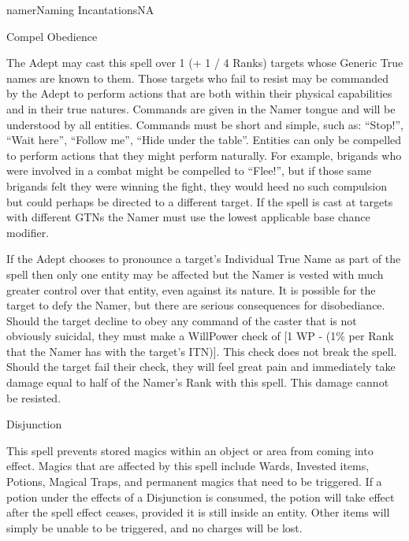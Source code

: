 \begin{college}[2.0]{namer}{Naming Incantations}{NA}
\begin{spell}[S-3]{Compel Obedience}
\begin{effects}
The Adept may cast this spell over 1 (+ 1 / 4 Ranks) targets whose
Generic True names are known to them. Those targets who fail to resist
may be commanded by the Adept to perform actions that are both within
their physical capabilities and in their true natures. Commands are
given in the Namer tongue and will be understood by all entities.
Commands must be short and simple, such as: ``Stop!'', ``Wait here'',
``Follow me'', ``Hide under the table''. Entities can only be
compelled to perform actions that they might perform naturally. For
example, brigands who were involved in a combat might be compelled to
``Flee!'', but if those same brigands felt they were winning the
fight, they would heed no such compulsion but could perhaps be
directed to a different target. If the spell is cast at targets with
different GTNs the Namer must use the lowest applicable base chance
modifier.

If the Adept chooses to pronounce a target's Individual True Name as
part of the spell then only one entity may be affected but the Namer
is vested with much greater control over that entity, even against its
nature. It is possible for the target to defy the Namer, but there are
serious consequences for disobediance. Should the target decline to
obey any command of the caster that is not obviously suicidal, they
must make a WillPower check of [1 \x WP - (1\% per Rank that the Namer
has with the target's ITN)]. This check does not break the spell.
Should the target fail their check, they will feel great pain and
immediately take damage equal to half of the Namer's Rank with this
spell.  This damage cannot be resisted.
\end{effects}
\end{spell}

\begin{spell}[S-4]{Disjunction}

\begin{effects}
This spell prevents stored magics within an object or area from coming
into effect. Magics that are affected by this spell include Wards,
Invested items, Potions, Magical Traps, and permanent magics that need
to be triggered. If a potion under the effects of a Disjunction is
consumed, the potion will take effect after the spell effect ceases,
provided it is still inside an entity. Other items will simply be
unable to be triggered, and no charges will be lost.
\end{effects}
\end{spell}


\end{college}
